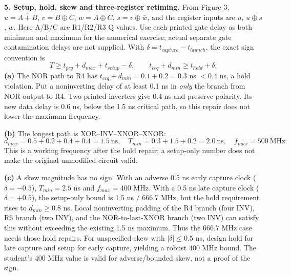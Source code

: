 \documentclass[10pt]{article}
\begin{document}
\newpage\textbf{5. Setup, hold, skew and three-register retiming.}
From Figure 3, $u=\overline{A+B}$, $v=B\oplus C$, $w=A\oplus C$, $s=\overline{v\oplus\bar w}$, and the register inputs are $u$, $\overline{u\oplus s}$, $w$. Here A/B/C are R1/R2/R3 Q values. Use each printed gate delay as both minimum and maximum for the numerical exercise; actual separate gate contamination delays are not supplied.
With $\delta=t_{capture}-t_{launch}$, the exact sign convention is
\[T\geq t_{pcq}+d_{max}+t_{setup}-\delta,\qquad
t_{ccq}+d_{min}\geq t_{hold}+\delta.\]
\textbf{(a)} The NOR path to R4 has $t_{ccq}+d_{min}=0.1+0.2=0.3$ ns $<0.4$ ns, a hold violation. Put a noninverting delay of at least 0.1 ns in \emph{only} the branch from NOR output to R4. Two printed inverters give 0.4 ns and preserve polarity. Its new data delay is 0.6 ns, below the 1.5 ns critical path, so this repair does not lower the maximum frequency.

\textbf{(b)} The longest path is XOR--INV--XNOR--XNOR:
\[d_{max}=0.5+0.2+0.4+0.4=1.5\ \mathrm{ns},\quad
T_{min}=0.3+1.5+0.2=2.0\ \mathrm{ns},\quad\boxed{f_{max}=500\ \mathrm{MHz}.}\]
This is a working frequency after the hold repair; a setup-only number does not make the original unmodified circuit valid.

\textbf{(c)} A skew magnitude has no sign. With an adverse 0.5 ns early capture clock ($\delta=-0.5$), $T_{min}=2.5$ ns and $f_{max}=400$ MHz. With a 0.5 ns late capture clock ($\delta=+0.5$), the setup-only bound is 1.5 ns / 666.7 MHz, but the hold requirement rises to $d_{min}\geq0.8$ ns. Local noninverting padding of the R4 branch (four INV), R6 branch (two INV), and the NOR-to-last-XNOR branch (two INV) can satisfy this without exceeding the existing 1.5 ns maximum. Thus the 666.7 MHz case needs those hold repairs. For unspecified skew with $|\delta|\leq0.5$ ns, design hold for late capture and setup for early capture, yielding a robust 400 MHz bound. The student's 400 MHz value is valid for adverse/bounded skew, not a proof of the sign.
\end{document}
